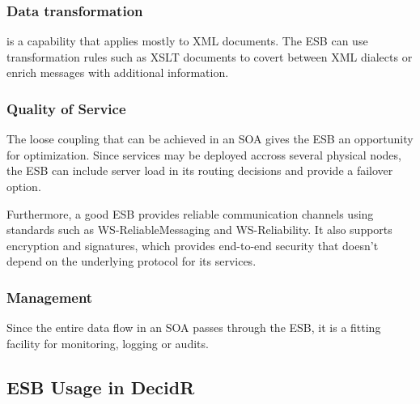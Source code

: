 \subsubsection{Data transformation}
\label{subsec:data-transformation}

is a capability that applies mostly to XML documents. The
ESB can use transformation rules such as XSLT documents to covert between XML
dialects or enrich messages with additional information.


\subsubsection{Quality of Service}
\label{subsec:quality-of-service}

The loose coupling that can be achieved in an SOA gives the ESB an opportunity
for optimization. Since services may be deployed accross several physical nodes,
the ESB can include server load in its routing decisions and provide a failover
option.

Furthermore, a good ESB provides reliable communication channels using standards
such as WS-ReliableMessaging and WS-Reliability. It also supports encryption and
signatures, which provides end-to-end security that doesn't depend on the
underlying protocol for its services.

\subsubsection{Management}
\label{subsec:management}

Since the entire data flow in an SOA passes through the ESB, it is
a fitting facility for monitoring, logging or audits.


\subsection{ESB Usage in DecidR}
\label{subsec:esb-usage-in-decidr}

